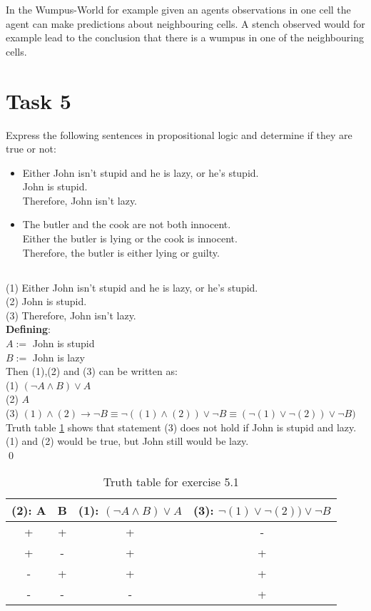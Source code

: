 \documentclass[paper=a4, fontsize=11pt]{scrartcl} %
\numberwithin{equation}{section} %
\numberwithin{figure}{section} %
\numberwithin{table}{section} %
\begin{document}
In the Wumpus-World for example given an agents observations in one cell the agent can make predictions about neighbouring cells. A stench observed would for example lead to the conclusion that there is a wumpus in one of the neighbouring cells.\\



\section{Task 5}
Express the following sentences in propositional logic and determine if they are true or
not:
\begin{itemize}
\item Either John isn't stupid and he is lazy, or he's stupid.\\
John is stupid.\\
Therefore, John isn't lazy.
\item The butler and the cook are not both innocent.\\
Either the butler is lying or the cook is innocent.\\
Therefore, the butler is either lying or guilty.
\end{itemize}

\subsection{}
(1) Either John isn't stupid and he is lazy, or he's stupid.\\
(2) John is stupid.\\
(3) Therefore, John isn't lazy.\\

\textbf{Defining}:\\
$A :=$ John is stupid\\
$B :=$ John is lazy\\

Then (1),(2) and (3) can be written as:\\
(1) $(\neg A\land B)\lor A$\\
(2) $A$\\
(3) $(1)\land (2)\to\neg B\equiv \neg ((1)\land (2))\lor\neg B\equiv (\neg (1) \lor\neg (2))\lor\neg B)$\\
Truth table \ref{tab:ex5.1} shows that statement (3) does not hold if John is stupid and lazy. (1) and (2) would be true, but John still would be lazy.\\\qed
\begin{table}[h]
\begin{tabular}{|c|c|c|c|}
\hline
(2): A&B&(1): $(\neg A\land B)\lor A$&(3): $\neg (1) \lor\neg (2))\lor\neg B$\\
\hline
+&+&+&-\\
+&-&+&+\\
-&+&+&+\\
-&-&-&+\\
\hline
\end{tabular}
\caption{Truth table for exercise 5.1}
\label{tab:ex5.1}
\end{table}
\end{document}
